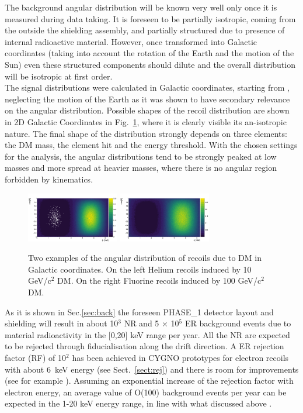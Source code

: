 \documentclass[physics,article,submit,moreauthors,pdftex]{Definitions/mdpi}
\begin{document}
 
 The background angular distribution will be known very well only once it is measured during data taking. It is foreseen to be partially isotropic, coming from the outside the shielding assembly, and partially structured due to presence of internal radioactive material. However, once transformed into Galactic coordinates (taking into account the rotation of the Earth and the motion of the Sun) even these structured components should dilute and the overall distribution will be isotropic at first order.\\
The signal distributions were calculated in Galactic coordinates, starting from \cite{bib:LEWIN199687,bib:Gondolo_2002,bib:baxter2021recommended}, neglecting the motion of the Earth as it was shown to have secondary relevance on the angular distribution. Possible shapes of the recoil distribution are shown in 2D Galactic Coordinates in Fig.~\ref{fig:spectra2D}, where it is clearly visible its an-isotropic nature. The final shape of the distribution strongly depends on three elements: the DM mass, the element hit and the energy threshold. With the chosen settings for the analysis, the angular distributions tend to be strongly peaked at low masses and more spread at heavier masses, where there is no angular region forbidden by kinematics.
\begin{figure}[!th]
  \centering
\includegraphics[width=0.36\textwidth]{Heliumrecoil_10GeV.png}
\includegraphics[width=0.36\textwidth]{WIMP_F_100GeV.png}
\caption{Two examples of the angular distribution of recoils due to DM in Galactic coordinates. On the left Helium recoils induced by 10 GeV/c$^2$ DM. On the right Fluorine recoils induced by 100 GeV/c$^2$ DM.}
 \label{fig:spectra2D}
\end{figure}


As it is shown in Sec.\ref{sec:back} the foreseen PHASE\_1 detector layout and shielding will result in about 10$^3$ NR and 5 $\times$ 10$^5$ ER background events due to material radioactivity in the [0,20] keV range per year. All the NR are expected to be rejected through fiducialisation along the drift direction.  A ER rejection factor (RF) of 10$^2$ has been achieved in CYGNO prototypes for electron recoils with about 6~keV energy (see Sect.~\ref{sect:rej}) and there is room for improvements (see for example \cite{bib:recoil}). Assuming an exponential increase of the rejection factor with electron energy, an average value of O(100) background events per year can be expected in the 1-20 keV energy range, in line with what discussed above \cite{Riffard:2016mgw,Phan:2015pda}. 
\end{document}
